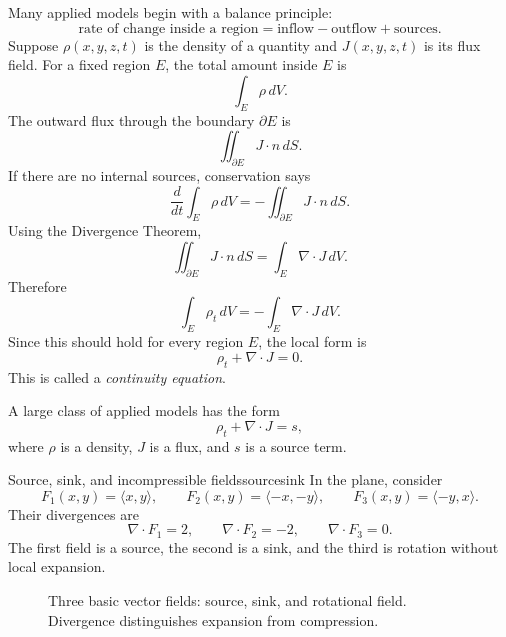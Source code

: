 \documentclass[11pt]{article}
\newcommand{\Div}{\nabla\!\cdot}
\begin{document}
Many applied models begin with a balance principle:
\[
\text{rate of change inside a region}=\text{inflow}-\text{outflow}+\text{sources}.
\]
Suppose $\rho(x,y,z,t)$ is the density of a quantity and $J(x,y,z,t)$ is its flux field. For a fixed region $E$, the total amount inside $E$ is
\[
\int_E \rho\,dV.
\]
The outward flux through the boundary $\partial E$ is
\[
\iint_{\partial E}J\cdot n\,dS.
\]
If there are no internal sources, conservation says
\[
\frac{d}{dt}\int_E \rho\,dV=-\iint_{\partial E}J\cdot n\,dS.
\]
Using the Divergence Theorem,
\[
\iint_{\partial E}J\cdot n\,dS=\int_E \Div J\,dV.
\]
Therefore
\[
\int_E \rho_t\,dV=-\int_E \Div J\,dV.
\]
Since this should hold for every region $E$, the local form is
\[
\rho_t+\Div J=0.
\]
This is called a \emph{continuity equation}.

\begin{importantbox}
A large class of applied models has the form
\[
\rho_t+\Div J=s,
\]
where $\rho$ is a density, $J$ is a flux, and $s$ is a source term.
\end{importantbox}

\begin{examplebox}{Source, sink, and incompressible fields}{sourcesink}
In the plane, consider
\[
F_1(x,y)=\langle x,y\rangle,\qquad F_2(x,y)=\langle -x,-y\rangle,\qquad F_3(x,y)=\langle -y,x\rangle.
\]
Their divergences are
\[
\Div F_1=2,\qquad \Div F_2=-2,\qquad \Div F_3=0.
\]
The first field is a source, the second is a sink, and the third is rotation without local expansion.
\end{examplebox}

\begin{figure}[H]
\centering
{}
\caption{Three basic vector fields: source, sink, and rotational field. Divergence distinguishes expansion from compression.}
\end{figure}
\end{document}

